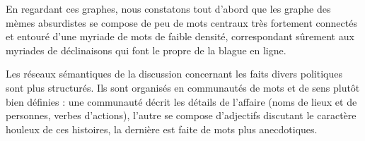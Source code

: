 En regardant ces graphes, nous constatons tout d{\textquoteright}abord
que les graphe des m\`emes absurdistes se compose de peu de mots
centraux tr\`es fortement connect\'es et entour\'e
d{\textquoteright}une myriade de mots de faible densit\'e,
correspondant s\^urement aux myriades de d\'eclinaisons qui font le
propre de la blague en ligne. 

\begin{figure}
    \centering
    
  \caption{
  }
\end{figure}


Les r\'eseaux s\'emantiques de la discussion concernant les faits divers
politiques sont plus structur\'es. Ils sont organis\'es en
communaut\'es de mots et de sens plut\^ot bien d\'efinies : une
communaut\'e d\'ecrit les d\'etails de l{\textquoteright}affaire (noms
de lieux et de personnes, verbes d{\textquoteright}actions),
l{\textquoteright}autre se compose d{\textquoteright}adjectifs
discutant le caract\`ere houleux de ces histoires, la derni\`ere est
faite de mots plus anecdotiques. 

